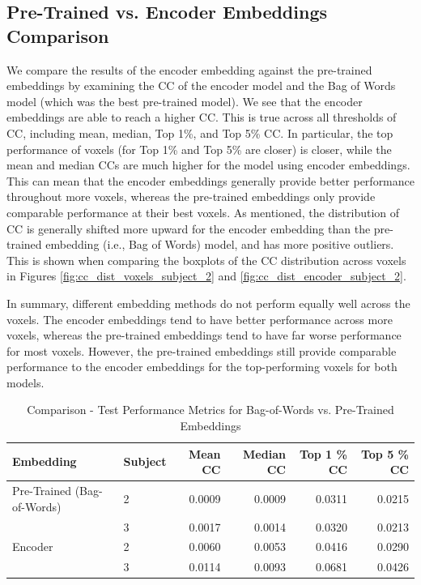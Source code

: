 \documentclass[10pt,letterpaper]{article}
\begin{document}
\subsection{Pre-Trained vs. Encoder Embeddings Comparison}

We compare the results of the encoder embedding against the pre-trained embeddings by examining the CC of the encoder model and the Bag of Words model (which was the best pre-trained model). We see that the encoder embeddings are able to reach a higher CC. This is true across all thresholds of CC, including mean, median, Top 1\%, and Top 5\% CC. In particular, the top performance of voxels (for Top 1\% and Top 5\% are closer) is closer, while the mean and median CCs are much higher for the model using encoder embeddings. This can mean that the encoder embeddings generally provide better performance throughout more voxels, whereas the pre-trained embeddings only provide comparable performance at their best voxels. As mentioned, the distribution of CC is generally shifted more upward for the encoder embedding than the pre-trained embedding (i.e., Bag of Words) model, and has more positive outliers. This is shown when comparing the boxplots of the CC distribution across voxels in Figures \ref{fig:cc_dist_voxels_subject_2} and \ref{fig:cc_dist_encoder_subject_2}.

In summary, different embedding methods do not perform equally well across the voxels. The encoder embeddings tend to have better performance across more voxels, whereas the pre-trained embeddings tend to have far worse performance for most voxels. However, the pre-trained embeddings still provide comparable performance to the encoder embeddings for the top-performing voxels for both models.


\begin{table}[ht]
\centering
\caption{Comparison - Test Performance Metrics for Bag-of-Words vs. Pre-Trained Embeddings}
\label{tab:cc_pretrained_vs_encoder_comparison}
\begin{tabular}{llrrrr}
\toprule
\textbf{Embedding}   & \textbf{Subject} & \textbf{Mean CC} & \textbf{Median CC} & \textbf{Top 1 \% CC} & \textbf{Top 5 \% CC} \\
\midrule
Pre-Trained (Bag-of-Words) & 2 & 0.0009 & 0.0009 & 0.0311 & 0.0215 \\
             & 3 & 0.0017 & 0.0014 & 0.0320 & 0.0213 \\
\addlinespace
Encoder      & 2 & 0.0060 & 0.0053 & 0.0416 & 0.0290 \\
             & 3 & 0.0114 & 0.0093 & 0.0681 & 0.0426 \\
\bottomrule
\end{tabular}
\end{table}
\end{document}
